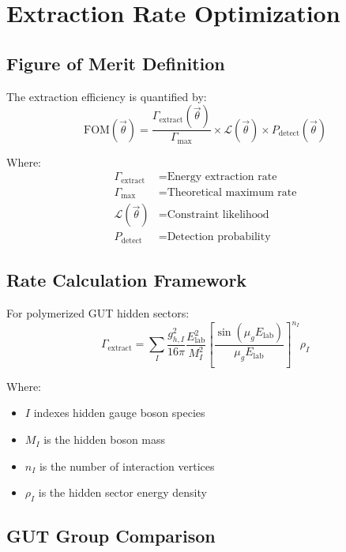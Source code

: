 \documentclass[11pt]{article}
\begin{document}
\section{Extraction Rate Optimization}

\subsection{Figure of Merit Definition}

The extraction efficiency is quantified by:
\begin{equation}
\boxed{
\text{FOM}(\vec{\theta}) = \frac{\Gamma_{\text{extract}}(\vec{\theta})}{\Gamma_{\text{max}}} \times \mathcal{L}(\vec{\theta}) \times P_{\text{detect}}(\vec{\theta})
}
\end{equation}

Where:
\begin{align}
\Gamma_{\text{extract}} &= \text{Energy extraction rate} \\
\Gamma_{\text{max}} &= \text{Theoretical maximum rate} \\
\mathcal{L}(\vec{\theta}) &= \text{Constraint likelihood} \\
P_{\text{detect}} &= \text{Detection probability}
\end{align}

\subsection{Rate Calculation Framework}

For polymerized GUT hidden sectors:
\begin{equation}
\Gamma_{\text{extract}} = \sum_{I} \frac{g_{h,I}^2}{16\pi} \frac{E_{\text{lab}}^2}{M_I^2} \left[\frac{\sin(\mu_g E_{\text{lab}})}{\mu_g E_{\text{lab}}}\right]^{n_I} \rho_I
\end{equation}

Where:
\begin{itemize}
    \item $I$ indexes hidden gauge boson species
    \item $M_I$ is the hidden boson mass
    \item $n_I$ is the number of interaction vertices
    \item $\rho_I$ is the hidden sector energy density
\end{itemize}

\subsection{GUT Group Comparison}
\end{document}
